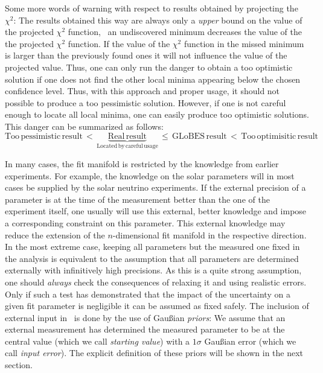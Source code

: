 Some more words of warning with respect to results obtained by projecting
the $\chi^2$:
The results obtained this way are always only a \emph{upper} bound on the
value of the projected $\chi^2$ function, \ie\ an undiscovered minimum 
decreases the value of the the projected $\chi^2$ function. If the value
of the $\chi^2$ function in the missed minimum is larger than the
previously found ones it will not influence the value of the projected 
value. 
Thus, one can only run the danger to obtain a too optimistic solution 
if one does not find the other local minima appearing 
below the chosen confidence level. Thus, with this approach and proper usage,
 it should not possible to produce a too pessimistic solution. 
However, if one is not careful enough to locate
all local minima, one can easily produce too optimistic solutions.
This danger can be summarized as follows:
\begin{equation}
\mathrm{Too \, pessimistic \, result} \, < \, \underbrace{\mathrm{Real \, result}}_{\mathrm{Located \, by \, careful \, usage}} \, \le \, \mathrm{GLoBES \, result} \,  < \,  \mathrm{Too \, optimisitic \, result} \nonumber
\end{equation}

In many cases, the fit manifold is restricted by the knowledge 
from earlier experiments. For example, the knowledge on the solar 
parameters will in most cases be supplied by the solar neutrino experiments. 
If the external precision of a parameter is at the time of the 
measurement better than the one of the experiment itself, one usually will use
this external, better knowledge and impose a corresponding constraint
 on this parameter. This external knowledge may reduce the extension of the 
$n$-dimensional fit manifold in the respective direction. In the most 
extreme case, keeping all parameters but the measured one fixed 
in the analysis is equivalent to the assumption that all parameters 
are determined externally with infinitively high precisions. As this 
is a quite strong assumption, one should \emph{always} check the 
consequences of relaxing it and using realistic errors. Only if such
a test has demonstrated that the impact of the uncertainty on a 
given fit parameter is negligible it can be assumed as fixed safely. 
 The inclusion of external input in \GLOBES\ is done by the use of 
Gau\ss ian {\em priors}: We assume that an external measurement has 
determined the measured parameter to be at the central value 
(which we call {\em starting value}) with a $1 \sigma$ Gau\ss ian error 
(which we call {\em input error}). The explicit definition of these 
priors will be shown in the next section. 

